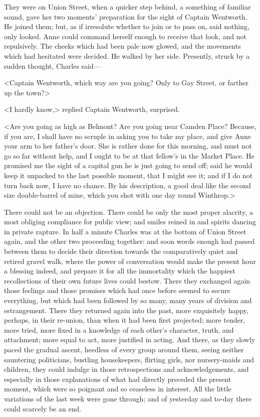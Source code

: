 They were on Union Street, when a quicker step behind, a something of familiar sound, gave her two moments' preparation for the sight of Captain Wentworth. He joined them; but, as if irresolute whether to join or to pass on, said nothing, only looked. Anne could command herself enough to receive that look, and not repulsively. The cheeks which had been pale now glowed, and the movements which had hesitated were decided. He walked by her side. Presently, struck by a sudden thought, Charles said—

<Captain Wentworth, which way are you going? Only to Gay Street, or farther up the town?>

<I hardly know,> replied Captain Wentworth, surprised.

<Are you going as high as Belmont? Are you going near Camden Place? Because, if you are, I shall have no scruple in asking you to take my place, and give Anne your arm to her father's door. She is rather done for this morning, and must not go so far without help, and I ought to be at that fellow's in the Market Place. He promised me the sight of a capital gun he is just going to send off; said he would keep it unpacked to the last possible moment, that I might see it; and if I do not turn back now, I have no chance. By his description, a good deal like the second size double-barrel of mine, which you shot with one day round Winthrop.>

There could not be an objection. There could be only the most proper alacrity, a most obliging compliance for public view; and smiles reined in and spirits dancing in private rapture. In half a minute Charles was at the bottom of Union Street again, and the other two proceeding together: and soon words enough had passed between them to decide their direction towards the comparatively quiet and retired gravel walk, where the power of conversation would make the present hour a blessing indeed, and prepare it for all the immortality which the happiest recollections of their own future lives could bestow. There they exchanged again those feelings and those promises which had once before seemed to secure everything, but which had been followed by so many, many years of division and estrangement. There they returned again into the past, more exquisitely happy, perhaps, in their re-union, than when it had been first projected; more tender, more tried, more fixed in a knowledge of each other's character, truth, and attachment; more equal to act, more justified in acting. And there, as they slowly paced the gradual ascent, heedless of every group around them, seeing neither sauntering politicians, bustling housekeepers, flirting girls, nor nursery-maids and children, they could indulge in those retrospections and acknowledgements, and especially in those explanations of what had directly preceded the present moment, which were so poignant and so ceaseless in interest. All the little variations of the last week were gone through; and of yesterday and to-day there could scarcely be an end.

